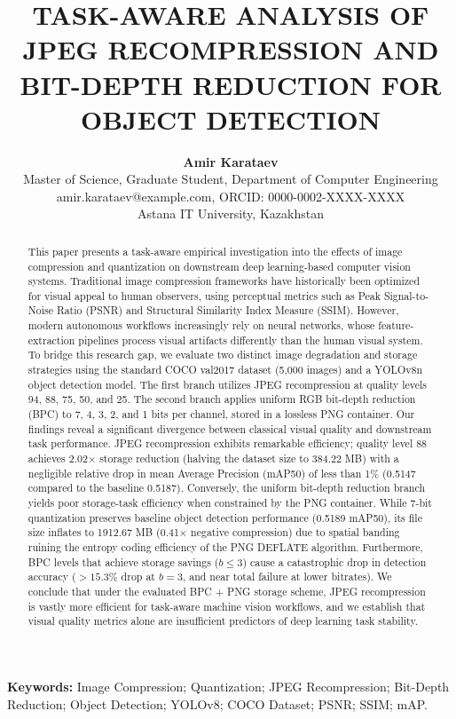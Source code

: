 \documentclass[12pt, a4paper]{article}
\title{TASK-AWARE ANALYSIS OF JPEG RECOMPRESSION AND BIT-DEPTH REDUCTION FOR OBJECT DETECTION}
\author{
  \textbf{Amir Karataev} \\
  \small Master of Science, Graduate Student, Department of Computer Engineering \\
  \small amir.karataev@example.com, ORCID: 0000-0002-XXXX-XXXX \\
  \small Astana IT University, Kazakhstan
}
\date{}
\begin{document}
\maketitle

\begin{abstract}
This paper presents a task-aware empirical investigation into the effects of image compression and quantization on downstream deep learning-based computer vision systems. Traditional image compression frameworks have historically been optimized for visual appeal to human observers, using perceptual metrics such as Peak Signal-to-Noise Ratio (PSNR) and Structural Similarity Index Measure (SSIM). However, modern autonomous workflows increasingly rely on neural networks, whose feature-extraction pipelines process visual artifacts differently than the human visual system. To bridge this research gap, we evaluate two distinct image degradation and storage strategies using the standard COCO val2017 dataset (5,000 images) and a YOLOv8n object detection model. The first branch utilizes JPEG recompression at quality levels 94, 88, 75, 50, and 25. The second branch applies uniform RGB bit-depth reduction (BPC) to 7, 4, 3, 2, and 1 bits per channel, stored in a lossless PNG container. Our findings reveal a significant divergence between classical visual quality and downstream task performance. JPEG recompression exhibits remarkable efficiency; quality level 88 achieves 2.02$\times$ storage reduction (halving the dataset size to 384.22 MB) with a negligible relative drop in mean Average Precision (mAP50) of less than 1\% (0.5147 compared to the baseline 0.5187). Conversely, the uniform bit-depth reduction branch yields poor storage-task efficiency when constrained by the PNG container. While 7-bit quantization preserves baseline object detection performance (0.5189 mAP50), its file size inflates to 1912.67 MB (0.41$\times$ negative compression) due to spatial banding ruining the entropy coding efficiency of the PNG DEFLATE algorithm. Furthermore, BPC levels that achieve storage savings ($b \le 3$) cause a catastrophic drop in detection accuracy ($>15.3\%$ drop at $b=3$, and near total failure at lower bitrates). We conclude that under the evaluated BPC + PNG storage scheme, JPEG recompression is vastly more efficient for task-aware machine vision workflows, and we establish that visual quality metrics alone are insufficient predictors of deep learning task stability.
\end{abstract}

\noindent \textbf{Keywords:} Image Compression; Quantization; JPEG Recompression; Bit-Depth Reduction; Object Detection; YOLOv8; COCO Dataset; PSNR; SSIM; mAP.
\end{document}
